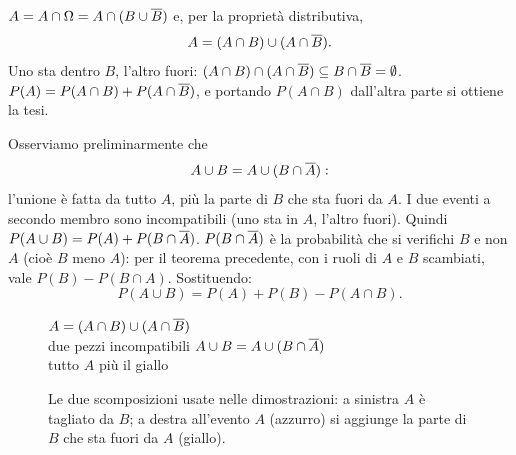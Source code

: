 
\begin{dimostrazione}
 $A = A \cap \Omega = A \cap (B \cup \overline{B})$ e, per la proprietà distributiva,
\[ A = (A \cap B) \cup (A \cap \overline{B}) . \]
 Uno sta dentro $B$, l'altro fuori: $(A \cap B) \cap (A \cap \overline{B}) \subseteq
B \cap \overline{B} = \emptyset$.
 $P(A) = P(A \cap B) + P(A \cap \overline{B})$, e portando $P(A \cap B)$ dall'altra parte si ottiene la
tesi.
\end{dimostrazione}


\begin{dimostrazione}
 Osserviamo preliminarmente che
\[ A \cup B = A \cup (B \cap \overline{A}) : \]
l'unione è fatta da tutto $A$, più la parte di $B$ che sta fuori da $A$. I due eventi a secondo membro sono
incompatibili (uno sta in $A$, l'altro fuori).
 Quindi $P(A \cup B) = P(A) + P(B \cap \overline{A})$.
 $P(B \cap \overline{A})$ è la probabilità che si verifichi $B$ e non $A$ (cioè $B$ meno
$A$): per il teorema precedente, con i ruoli di $A$ e $B$ scambiati, vale $P(B) - P(B \cap A)$. Sostituendo:
\[ P(A \cup B) = P(A) + P(B) - P(A \cap B) . \]
\end{dimostrazione}

\begin{figure}[H]
\centering
\venn{\fill[mspiA!25] \vennA; \begin{scope}\clip \vennA; \fill[evid] \vennB; \end{scope}}
     {$A = (A \cap B) \cup (A \cap \overline{B})$\\ due pezzi incompatibili}
\hspace{1.5cm}
     {$A \cup B = A \cup (B \cap \overline{A})$\\ tutto $A$ più il giallo}
\caption{Le due scomposizioni usate nelle dimostrazioni: a sinistra $A$ è tagliato da $B$; a destra all'evento $A$
(azzurro) si aggiunge la parte di $B$ che sta fuori da $A$ (giallo).}
\end{figure}

